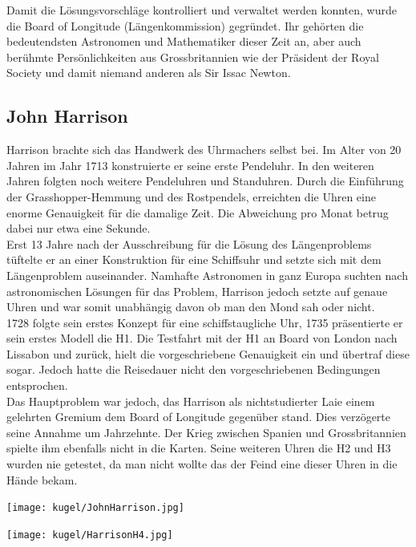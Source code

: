 \begin{refsection}
\begin{refsection}
Damit die Lösungsvorschläge kontrolliert und verwaltet werden konnten, wurde die Board of Longitude (Längenkommission) gegründet. Ihr gehörten die bedeutendsten Astronomen und Mathematiker dieser Zeit an, aber auch berühmte Persönlichkeiten aus Grossbritannien wie der Präsident der Royal Society und damit niemand anderen als Sir Issac Newton.


\subsection{John Harrison}
Harrison brachte sich das Handwerk des Uhrmachers selbst bei. Im Alter von 20 Jahren im Jahr 1713 konstruierte er seine erste Pendeluhr. In den weiteren Jahren folgten noch weitere Pendeluhren und Standuhren. Durch die Einführung der Grasshopper-Hemmung und des Rostpendels, erreichten die Uhren eine enorme Genauigkeit für die damalige Zeit. Die Abweichung pro Monat betrug dabei nur etwa eine Sekunde. \\
Erst 13 Jahre nach der Ausschreibung für die Lösung des Längenproblems tüftelte er an einer Konstruktion für eine Schiffsuhr und setzte sich mit dem Längenproblem auseinander.
Namhafte Astronomen in ganz Europa suchten nach astronomischen Lösungen für das Problem, Harrison jedoch setzte auf genaue Uhren und war somit unabhängig davon ob man den Mond sah oder nicht.\\
1728 folgte sein erstes Konzept für eine schiffstaugliche Uhr, 1735 präsentierte er sein erstes Modell die H1.
Die Testfahrt mit der H1 an Board von London nach Lissabon und zurück, hielt die vorgeschriebene Genauigkeit ein und übertraf diese sogar. Jedoch hatte die Reisedauer nicht den vorgeschriebenen Bedingungen entsprochen.\\
Das Hauptproblem war jedoch, das Harrison als nichtstudierter Laie einem gelehrten Gremium dem Board of Longitude gegenüber stand. Dies verzögerte seine Annahme um Jahrzehnte. Der Krieg zwischen Spanien und Grossbritannien spielte ihm ebenfalls nicht in die Karten. Seine weiteren Uhren die H2 und H3 wurden nie getestet, da man nicht wollte das der Feind eine dieser Uhren in die Hände bekam.

\begin{center}
        \texttt{[image: kugel/JohnHarrison.jpg]}
\end{center}

\begin{center}
        \texttt{[image: kugel/HarrisonH4.jpg]}
\end{center}


\end{refsection}
\end{refsection}
